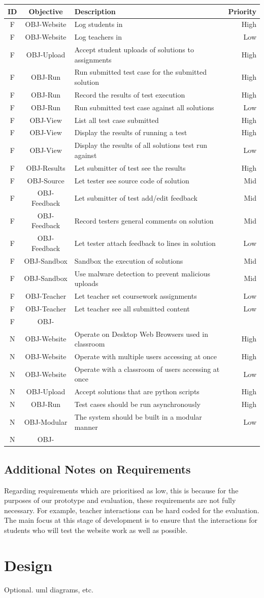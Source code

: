 \documentclass[a4paper,11pt]{report}
\newcounter{FunCount}
\newcounter{NFunCount}
\newcommand{\freq}[3]{\addtocounter{FunCount}{1}F\arabic{FunCount} & OBJ-#1 & #2 & #3\\}
\newcommand{\nfreq}[3]{\addtocounter{NFunCount}{1}N\arabic{NFunCount} & OBJ-#1 & #2 & #3\\}
\begin{document}
\begin{longtable}{cclr}
\textbf{ID} & \textbf{Objective} & \textbf{Description} & \textbf{Priority}\\\hline
\freq{Website}{Log students in}{High}
\freq{Website}{Log teachers in}{Low}
\freq{Upload}{Accept student uploads of solutions to assignments}{High}
\freq{Run}{Run submitted test case for the submitted solution}{High}
\freq{Run}{Record the results of test execution}{High}
\freq{Run}{Run submitted test case against all solutions}{Low}
\freq{View}{List all test case submitted}{High}
\freq{View}{Display the results of running a test}{High}
\freq{View}{Display the results of all solutions test run against}{Low}
\freq{Results}{Let submitter of test see the results}{High}
\freq{Source}{Let tester see source code of solution}{Mid}
\freq{Feedback}{Let submitter of test add/edit feedback}{Mid}
\freq{Feedback}{Record testers general comments on solution}{Mid}
\freq{Feedback}{Let tester attach feedback to lines in solution}{Low}
\freq{Sandbox}{Sandbox the execution of solutions}{Mid}
\freq{Sandbox}{Use malware detection to prevent malicious uploads}{Mid}
\freq{Teacher}{Let teacher set coursework assignments}{Low}
\freq{Teacher}{Let teacher see all submitted content}{Low}
\freq{}{}{}
\nfreq{Website}{Operate on Desktop Web Browsers used in classroom}{High}
\nfreq{Website}{Operate with multiple users accessing at once}{High}
\nfreq{Website}{Operate with a classroom of users accessing at once}{Low}
\nfreq{Upload}{Accept solutions that are python scripts}{High}
\nfreq{Run}{Test cases should be run asynchronously}{High}
\nfreq{Modular}{The system should be built in a modular manner}{Low}
\nfreq{}{}{}
\end{longtable}

\subsection{Additional Notes on Requirements}
Regarding requirements which are prioritised as low, this is because for the purposes of our prototype and evaluation, these requirements are not fully necessary. For example, teacher interactions can be hard coded for the evaluation. The main focus at this stage of development is to ensure that the interactions for students who will test the website work as well as possible.

\section{Design}
Optional. uml diagrams, etc.
\end{document}
